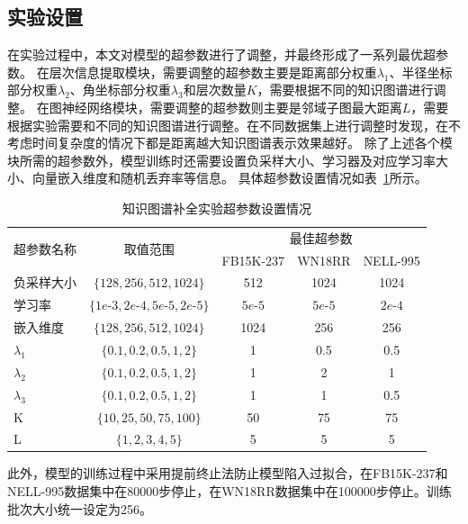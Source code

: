 \documentclass[algorithmlist, AutoFakeBold, AutoFakeSlant, figurelist, tablelist, nomlist, masters]{seuthesix}
\begin{document}
\subsection{实验设置}
在实验过程中，本文对模型的超参数进行了调整，并最终形成了一系列最优超参数。
在层次信息提取模块，需要调整的超参数主要是距离部分权重$\lambda_1$、半径坐标部分权重$\lambda_2$、角坐标部分权重$\lambda_3$和层次数量$K$，需要根据不同的知识图谱进行调整。
在图神经网络模块，需要调整的超参数则主要是邻域子图最大距离$L$，需要根据实验需要和不同的知识图谱进行调整。在不同数据集上进行调整时发现，在不考虑时间复杂度的情况下都是距离越大知识图谱表示效果越好。
除了上述各个模块所需的超参数外，模型训练时还需要设置负采样大小、学习器及对应学习率大小、向量嵌入维度和随机丢弃率等信息。
具体超参数设置情况如表~\ref{Hyperparameters1}所示。
\begin{table}[]
  \centering
  \begin{tabular*}{0.95\textwidth}{@{\extracolsep{\fill}}lcccc}
  \toprule[1pt]
  \multirow{2}{*}{超参数名称} & \multirow{2}{*}{取值范围} & \multicolumn{3}{c}{最佳超参数}\\ 
    & & FB15K-237 & WN18RR & NELL-995 \\ \hline
  负采样大小 & $\{128, 256, 512, 1024\}$ & 512 & 1024 & 1024 \\
  学习率 & $\{1e\text{-}3, 2e\text{-}4, 5e\text{-}5, 2e\text{-}5\}$ & $5e\text{-}5$ & $5e\text{-}5$ & $2e\text{-}4$ \\
  嵌入维度 & $\{128, 256, 512, 1024\}$ & 1024 & 256 & 256 \\
  $\lambda_1$ & $\{0.1, 0.2, 0.5, 1, 2\}$ & 1 & 0.5 & 0.5 \\
  $\lambda_2$ & $\{0.1, 0.2, 0.5, 1, 2\}$ & 1 & 2 & 1 \\
  $\lambda_3$ & $\{0.1, 0.2, 0.5, 1, 2\}$ & 1 & 1 & 0.5 \\
  K & $\{10, 25, 50, 75, 100\}$ & 50 & 75 & 75 \\
  L & $\{1, 2, 3, 4, 5\}$ & 5 & 5 & 5 \\
  \bottomrule[1pt]
  \end{tabular*}
  \caption{知识图谱补全实验超参数设置情况}
  \label{Hyperparameters1}
\end{table}
此外，模型的训练过程中采用提前终止法防止模型陷入过拟合，在FB15K-237和NELL-995数据集中在80000步停止，在WN18RR数据集中在100000步停止。训练批次大小统一设定为256。
\end{document}
